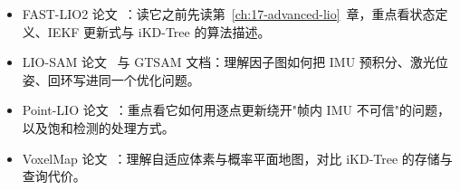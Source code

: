 \begin{reading}

\begin{itemize}
  \item FAST-LIO2 论文~\cite{xu2022fastlio2}：读它之前先读第~\ref{ch:17-advanced-lio}~章，重点看状态定义、IEKF 更新式与 iKD-Tree 的算法描述。
  \item LIO-SAM 论文~\cite{shan2020liosam} 与 GTSAM 文档：理解因子图如何把 IMU 预积分、激光位姿、回环写进同一个优化问题。
  \item Point-LIO 论文~\cite{he2023pointlio}：重点看它如何用逐点更新绕开"帧内 IMU 不可信"的问题，以及饱和检测的处理方式。
  \item VoxelMap 论文~\cite{yuan2022voxelmap}：理解自适应体素与概率平面地图，对比 iKD-Tree 的存储与查询代价。
\end{itemize}


\end{reading}
